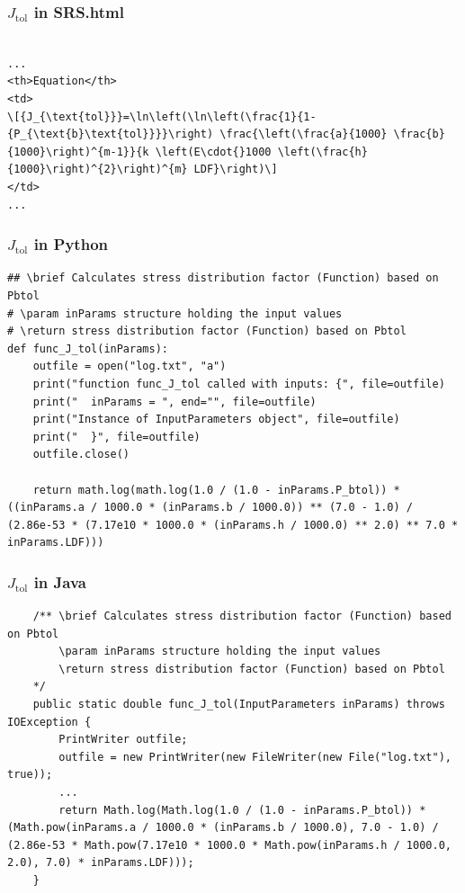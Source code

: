 \documentclass{beamer}
\begin{document}

\begin{frame}

\frametitle{$J_{\mbox{tol}}$ in SRS.html}

\begin{lstlisting}

...
<th>Equation</th>
<td>
\[{J_{\text{tol}}}=\ln\left(\ln\left(\frac{1}{1-{P_{\text{b}\text{tol}}}}\right) \frac{\left(\frac{a}{1000} \frac{b}{1000}\right)^{m-1}}{k \left(E\cdot{}1000 \left(\frac{h}{1000}\right)^{2}\right)^{m} LDF}\right)\]
</td>
...
\end{lstlisting}

\end{frame}

\begin{frame}

\frametitle{$J_{\mbox{tol}}$ in Python}

\begin{lstlisting}
## \brief Calculates stress distribution factor (Function) based on Pbtol
# \param inParams structure holding the input values
# \return stress distribution factor (Function) based on Pbtol
def func_J_tol(inParams):
    outfile = open("log.txt", "a")
    print("function func_J_tol called with inputs: {", file=outfile)
    print("  inParams = ", end="", file=outfile)
    print("Instance of InputParameters object", file=outfile)
    print("  }", file=outfile)
    outfile.close()
    
    return math.log(math.log(1.0 / (1.0 - inParams.P_btol)) * ((inParams.a / 1000.0 * (inParams.b / 1000.0)) ** (7.0 - 1.0) / (2.86e-53 * (7.17e10 * 1000.0 * (inParams.h / 1000.0) ** 2.0) ** 7.0 * inParams.LDF)))
\end{lstlisting}
\end{frame}


\begin{frame}

\frametitle{$J_{\mbox{tol}}$ in Java}

\begin{lstlisting}
    /** \brief Calculates stress distribution factor (Function) based on Pbtol
        \param inParams structure holding the input values
        \return stress distribution factor (Function) based on Pbtol
    */
    public static double func_J_tol(InputParameters inParams) throws IOException {
        PrintWriter outfile;
        outfile = new PrintWriter(new FileWriter(new File("log.txt"), true));
        ...
        return Math.log(Math.log(1.0 / (1.0 - inParams.P_btol)) * (Math.pow(inParams.a / 1000.0 * (inParams.b / 1000.0), 7.0 - 1.0) / (2.86e-53 * Math.pow(7.17e10 * 1000.0 * Math.pow(inParams.h / 1000.0, 2.0), 7.0) * inParams.LDF)));
    }
\end{lstlisting}
\end{frame}
\end{document}
